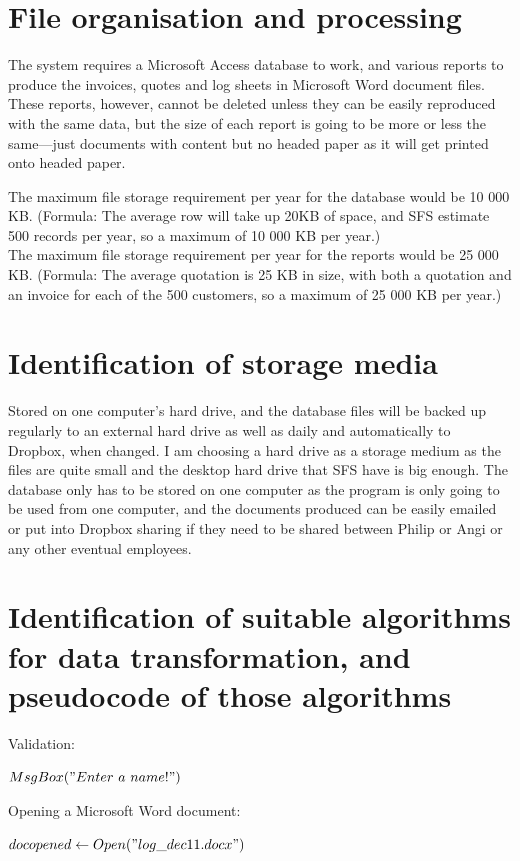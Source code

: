 	\section{File organisation and processing}
The system requires a Microsoft Access database to work, and various
reports to produce the invoices, quotes and log sheets in Microsoft Word document files.  These reports, however, cannot be deleted unless
they can be easily reproduced with the same data, but the size of each
report is going to be more or less the same---just documents with content but no headed paper as it will get printed onto headed paper.

The maximum file storage requirement per year for the database would be 10 000 KB. (Formula: The average row will take up 20KB of space, and SFS estimate 500 records per year, so a maximum of 10 000 KB per year.)\\ 
The maximum file storage requirement per year for the reports would be 25 000 KB. (Formula: The average quotation is 25 KB in size, with both a quotation and an invoice for each of the 500 customers, so a maximum of 25 000 KB per year.)
	\section{Identification of storage media}
Stored on one computer's hard drive, and the database files will be backed
up regularly to an external hard drive as well as daily and automatically
to Dropbox, when changed.  I am choosing a hard drive as a storage medium as the files are quite small and the desktop hard drive that SFS have is big enough.  The database only has to be stored on one computer as the program is only going to be used from one computer, and the documents produced can be easily emailed or put into Dropbox sharing if they need to be shared between Philip or Angi or any other eventual employees.

	\section{Identification of suitable algorithms for data transformation, and pseudocode of those algorithms}
Validation:
\begin{algorithmic}
                $MsgBox("Enter\ a\ name!")$
        \EndIf
\end{algorithmic}

Opening a Microsoft Word document:
\begin{algorithmic}
                \State $docopened \gets Open("log\_dec11.docx")$
        \EndIf
\end{algorithmic}

